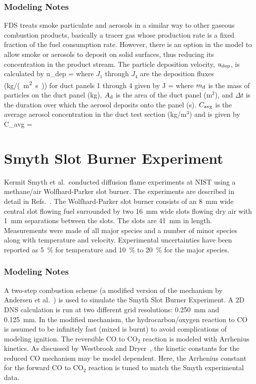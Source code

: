 \subsubsection{Modeling Notes}

FDS treats smoke particulate and aerosols in a similar way to other gaseous combustion products, basically a tracer gas whose production rate is a fixed fraction of the fuel consumption rate. However, there is an option in the model to allow smoke or aerosols to deposit on solid surfaces, thus reducing its concentration in the product stream. The particle deposition velocity, $u_{\rm dep}$, is calculated by
\be
   u_{\rm dep} = 
\ee
where $J_1$ through $J_4$ are the deposition fluxes (\si{kg/(m^2.s)}) for duct panels 1 through 4 given by
\be
   J = 
\ee
where $m_{\rm d}$ is the mass of particles on the duct panel (kg), $A_{\rm d}$ is the area of the duct panel (m$^2$), and $\Delta t$ is the duration over which the aerosol deposits onto the panel (s). $C_{\rm avg}$ is the
average aerosol concentration in the duct test section (kg/m$^3$) and is given by
\be
   C_{\rm avg} = 
\ee

\section{Smyth Slot Burner Experiment}
\label{Smyth_Slot_Burner_Description}

Kermit Smyth et al.~conducted diffusion flame experiments at NIST using a methane/air Wolfhard-Parker slot burner. The experiments are described in detail in Refs.~\cite{Norton:1,Smyth:1}. The Wolfhard-Parker slot burner consists of an 8~mm wide central slot flowing fuel surrounded by two 16~mm wide slots flowing dry air with 1~mm separations between the slots. The slots are 41~mm in length. Measurements were made of all major species and a number of minor species along with temperature and velocity. Experimental uncertainties have been reported as 5~\% for temperature  and 10~\% to 20~\% for the major species.

\subsubsection{Modeling Notes}

A two-step combustion scheme (a modified version of the mechanism by Andersen et al.~\cite{AndersenJ:1}) is used to simulate the Smyth Slot Burner Experiment.  A 2D DNS calculation is run at two different grid resolutions: 0.250~mm and 0.125~mm.  In the modified mechanism, the hydrocarbon/oxygen reaction to CO is assumed to be infinitely fast (mixed is burnt) to avoid complications of modeling ignition.  The reversible CO to CO$_2$ reaction is modeled with Arrhenius kinetics.  As discussed by Westbrook and Dryer~\cite{Westbrook:1}, the kinetic constants for the reduced CO mechanism may be model dependent.  Here, the Arrhenius constant for the forward CO to CO$_2$ reaction is tuned to match the Smyth experimental data.

